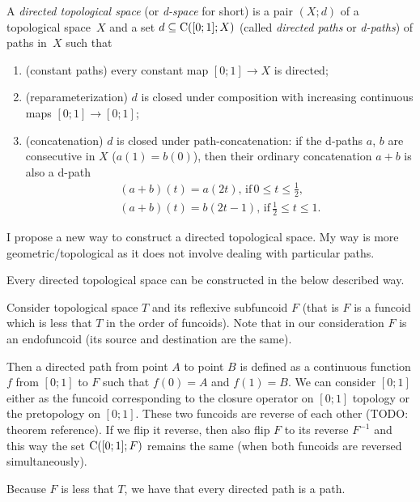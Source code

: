 \begin{defn}
A \emph{directed topological space} (or \emph{d-space} for short) is a pair $(X;d)$ of a topological space~$X$ and
a set $d\subseteq\mathrm{C}([0;1];X)$ (called \emph{directed paths} or \emph{d-paths}) of paths in~$X$ such that
\begin{enumerate}
\item (constant paths) every constant map $[0;1]\to X$ is directed;
\item (reparameterization) $d$ is closed under composition with increasing continuous maps $[0;1]\to [0;1]$;
\item (concatenation) $d$ is closed under path-concatenation: if the d-paths $a$, $b$ are consecutive in $X$ ($a(1)=b(0)$), then their ordinary concatenation $a+b$ is also a d-path
\begin{gather*}
(a+b)(t) = a(2t),\,\text{if}\, 0\le t\le \frac{1}{2}, \\
(a+b)(t) = b(2t-1),\,\text{if}\, \frac{1}{2}\le t\le 1.
\end{gather*}
\end{enumerate}
\end{defn}

I propose a new way to construct a directed topological space. My way is more geometric/topological as it does not involve dealing with particular paths.

\begin{conjecture}
Every directed topological space can be constructed in the below described way.
\end{conjecture}

Consider topological space $T$ and its reflexive subfuncoid $F$ (that is $F$ is a funcoid which is less that $T$ in the order of funcoids).
Note that in our consideration $F$ is an endofuncoid (its source and destination are the same).

Then a directed path from point $A$ to point $B$ is defined as a continuous function $f$ from $[0;1]$ to $F$ such that $f(0)=A$ and $f(1)=B$.
We can consider $[0;1]$ either as the funcoid corresponding to the closure operator on $[0;1]$ topology or the pretopology on $[0;1]$.
These two funcoids are reverse of each other (TODO: theorem reference). If we flip it reverse, then also flip $F$ to its reverse $F^{-1}$ and
this way the set $\mathrm{C}([0;1];F)$ remains the same (when both funcoids are reversed simultaneously). 

Because $F$ is less that $T$, we have that every directed path is a path.

